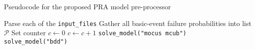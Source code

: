 \begin{algorithm}[H]
\caption{Pseudocode for the proposed PRA model pre-processor}
\label{alg:preprocessor}
\begin{algorithmic}[1]
\State Parse each of the \texttt{input\_files}
\State Gather all basic-event failure probabilities into list $\mathcal{P}$
\State Set counter $c \leftarrow 0$
\State $c \leftarrow c + 1$
\EndIf
\EndFor
{}
\State \texttt{solve\_model("mocus mcub")}
\Else
\State \texttt{solve\_model("bdd")}
\EndIf
\EndProcedure
\end{algorithmic}
\end{algorithm}